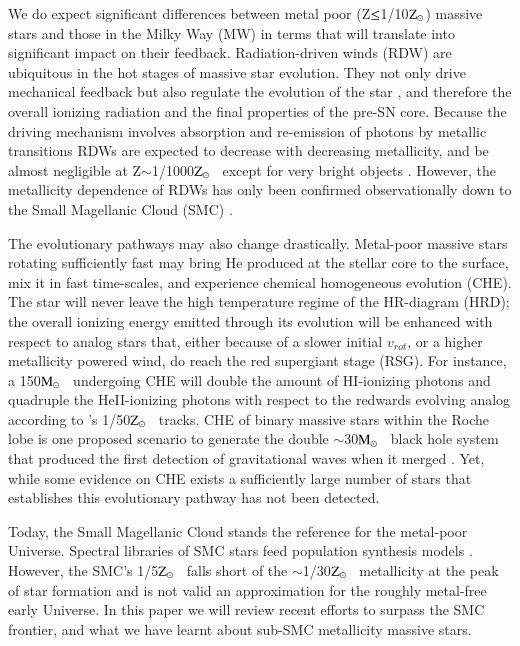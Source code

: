 \documentclass{iau}
\newcommand{\Msun}{$\rm M_{\odot}$}
\newcommand{\Zsun}{$\rm Z_{\odot}$}
\newcommand{\vrot}{$v_{rot}$}
\begin{document}
We do expect significant differences between metal poor (Z$\rm \leq$1/10\Zsun) massive stars
and those in the Milky Way (MW) in terms that will translate into significant impact on their feedback.
Radiation-driven winds (RDW) are ubiquitous in the hot stages of massive star evolution.
They not only drive mechanical feedback but also regulate the evolution
of the star \citep[e.g.][]{Mal94}, and therefore
the overall ionizing radiation and the final properties of the pre-SN core.
Because the driving mechanism involves absorption and re-emission of photons by metallic transitions
RDWs are expected to decrease with decreasing metallicity, and be almost negligible
at Z$\sim$1/1000\Zsun~ except for very bright objects \citep{K02}.
However, the metallicity dependence of RDWs
has only been confirmed observationally down to the
Small Magellanic Cloud (SMC) \citep{Mal07b}.

The evolutionary pathways may also change drastically.
Metal-poor massive stars rotating sufficiently fast may bring
He produced at the stellar core to the surface,
mix it in fast time-scales, and experience chemical homogeneous evolution (CHE).
The star will never leave the high temperature regime of the HR-diagram (HRD);
the overall ionizing energy emitted through its evolution
will be enhanced with respect to analog stars
that, either because of a slower initial \vrot,
or a higher metallicity powered wind,
do reach the red supergiant stage (RSG).
For instance, a 150\Msun~ undergoing CHE will double the amount of
HI-ionizing photons and quadruple the HeII-ionizing photons
with respect to the redwards evolving analog
according to \citet{Szal15}'s 1/50\Zsun~ tracks.
CHE of binary massive stars within the Roche lobe
is one proposed scenario to generate the double
$\sim$30\Msun~ black hole system that produced the
first detection of gravitational waves when it merged \citep{MM16}.
Yet, while some evidence on CHE exists \citep{MDRM13}
a sufficiently large number of stars that establishes this
evolutionary pathway has not been detected.

Today, the Small Magellanic Cloud stands
the reference for the metal-poor Universe.
Spectral libraries of SMC stars feed population synthesis models \citep[e.g.][]{LLH01}.
However, the SMC's 1/5\Zsun~ falls short of the $\sim$1/30\Zsun~ metallicity 
at the peak of star formation \citep{MD14} and is
not valid an approximation for the roughly metal-free early Universe.
In this paper we will review recent efforts to surpass the SMC frontier,
and what we have learnt about sub-SMC metallicity massive stars.
\end{document}
